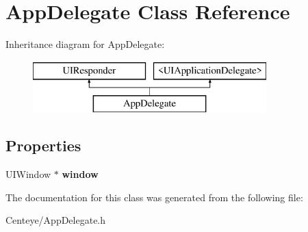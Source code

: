 \hypertarget{interface_app_delegate}{\section{App\+Delegate Class Reference}
\label{interface_app_delegate}
}
Inheritance diagram for App\+Delegate\+:\begin{figure}[H]
\begin{center}
\leavevmode
\includegraphics[height=2.000000cm]{interface_app_delegate}
\end{center}
\end{figure}
\subsection*{Properties}
\begin{DoxyCompactItemize}
\item 
\hypertarget{interface_app_delegate_acf48ac24125e688cac1a85445cd7fac2}{U\+I\+Window $\ast$ {\bfseries window}}\label{interface_app_delegate_acf48ac24125e688cac1a85445cd7fac2}

\end{DoxyCompactItemize}


The documentation for this class was generated from the following file\+:\begin{DoxyCompactItemize}
\item 
Centeye/App\+Delegate.\+h\end{DoxyCompactItemize}

